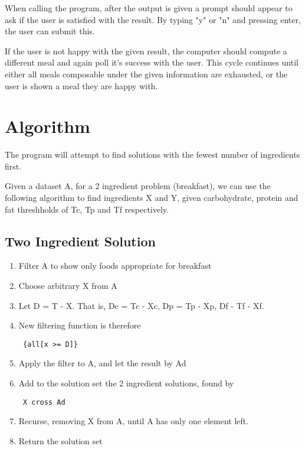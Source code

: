 \documentclass[a4paper]{article}
\begin{document}
When calling the program, after the output is given a prompt should 
appear to ask if the user is satisfied with the result. By typing "y" or 
"n" and pressing enter, the user can submit this.

If the user is not happy with the given result, the computer should 
compute a different meal and again poll it's success with the user. This 
cycle continues until either all meals composable under the given 
information are exhausted, or the user is shown a meal they are happy 
with.

\section{Algorithm}

The program will attempt to find solutions with the fewest number of 
ingredients first.

Given a dataset A, for a 2 ingredient problem (breakfast), we can use 
the following algorithm to find ingredients X and Y, given carbohydrate, 
protein and fat threshholds of Tc, Tp and Tf respectively.

\subsection{Two Ingredient Solution}

\begin{enumerate}
  \item Filter A to show only foods appropriate for breakfast

  \item Choose arbitrary X from A

  \item Let D = T - X. That is, Dc = Tc - Xc, Dp = Tp - Xp, Df - Tf - Xf.

  \item New filtering function is therefore \begin{verbatim} {all[x >= D]} \end{verbatim}

  \item Apply the filter to A, and let the result by Ad

  \item Add to the solution set the 2 ingredient solutions, found by \begin{verbatim} X cross Ad \end{verbatim}

  \item Recurse, removing X from A, until A has only one element left.

  \item Return the solution set
\end{enumerate}
\end{document}
